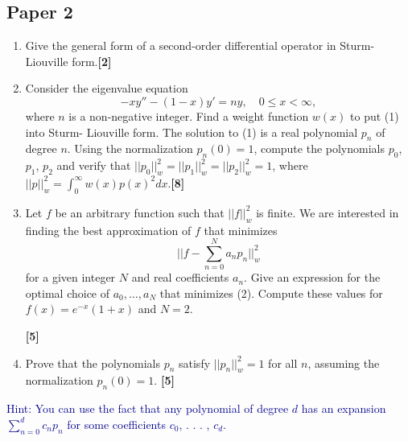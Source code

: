 \documentclass[a4paper]{article}
\begin{document}
\subsection{Paper 2}
\begin{qns}\leavevmode
\begin{enumerate}[label=(\alph*)]
\item Give the general form of a second-order differential operator in Sturm-Liouville
form.\hfill\textbf{[2]}
\item Consider the eigenvalue equation
\begin{equation}
    -xy''-(1-x)y'=ny,\quad0\leq x<\infty,\tag{1}
\end{equation}
where $n$ is a non-negative integer. Find a weight function $w(x)$ to put (1) into Sturm- Liouville form. The solution to (1) is a real polynomial $p_n$ of degree $n$. Using the normalization $p_n(0) = 1$, compute the polynomials $p_0$, $p_1$, $p_2$ and verify that $||p_0||^2_w=||p_1||^2_w=||p_2||_w^2=1$, where $||p||_w^2=\int_0^\infty w(x)p(x)^2dx$.\hfill\textbf{[8]}
\item Let $f$ be an arbitrary function such that $||f||_w^2$ is finite. We are interested in finding the best approximation of $f$ that minimizes
\begin{equation}
    \bigg|\bigg|f-\sum_{n=0}^Na_np_n\bigg|\bigg|_w^2\tag{2}
\end{equation}
for a given integer $N$ and real coefficients $a_n$. Give an expression for the optimal choice of $a_0,\dots, a_N$ that minimizes (2). Compute these values for $f(x) = e^{−x}(1 + x)$ and $N = 2$. 

\hfill\textbf{[5]}
\item Prove that the polynomials $p_n$ satisfy $||p_n||^2_w=1$ for all $n$, assuming the normalization $p_n(0) = 1$. \hfill\textbf{[5]}
\end{enumerate}
\begin{mdframed}\textcolor{darkblue}{Hint: You can use the fact that any polynomial of degree $d$ has an expansion $\sum_{n=0}^dc_np_n$ for some coefficients $c_0$, . . . , $c_d$.}
\end{mdframed}
\end{qns}
\end{document}
